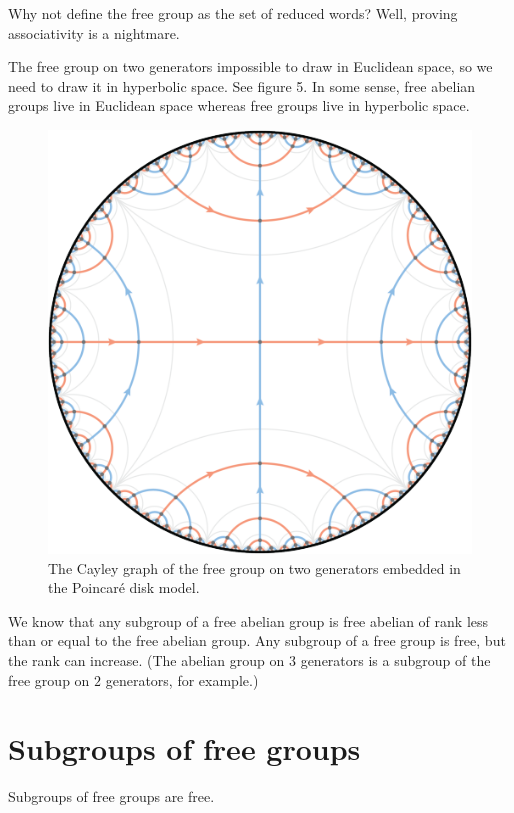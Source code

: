 \documentclass[11pt, twoside]{amsart}
\begin{document}
Why not define the free group as the set of reduced words? Well,  proving associativity is a nightmare. 

The free group on two generators impossible to draw in Euclidean space, so we need to draw it in hyperbolic space. See figure 5. In some sense, free abelian groups live in Euclidean space whereas free groups live in hyperbolic space.
\begin{figure}
\centering
\includegraphics[scale=0.3]{images/free_group_on_two_generators}
\caption{The Cayley graph of the free group on two generators embedded in the Poincar\'e disk model.}
\end{figure}

We know that any subgroup of a free abelian group is free abelian of rank less than or equal to the free abelian group. Any subgroup of a free group is free, but the rank can increase. (The abelian group on $3$ generators is a subgroup of the free group on $2$ generators, for example.)

\section{Subgroups of free groups}
\begin{proposition}
Subgroups of free groups are free.
\end{proposition}
\end{document}
